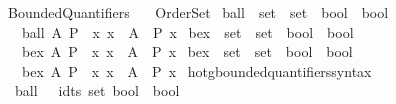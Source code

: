 %
\begin{isabellebody}%
%
%
\isadelimdocument
%
\endisadelimdocument
%
\isatagdocument
\isanewline
\isanewline
%
\isamarkuptrue%
%
\endisatagdocument
{\isafolddocument}%
%
\isadelimdocument
%
\endisadelimdocument
%
\isadelimtheory
%
\endisadelimtheory
%
\isatagtheory
{}\isamarkupfalse%
\ Bounded{\isacharunderscore}{\kern0pt}Quantifiers\isanewline
\ \ \ Order{\isacharunderscore}{\kern0pt}Set\isanewline
{}%
\endisatagtheory
{\isafoldtheory}%
%
\isadelimtheory
\isanewline
%
\endisadelimtheory
\isanewline
{}\isamarkupfalse%
\ ball\ {\isacharcolon}{\kern0pt}{\isacharcolon}{\kern0pt}\ {\isacartoucheopen}set\ {\isasymRightarrow}\ {\isacharparenleft}{\kern0pt}set\ {\isasymRightarrow}\ bool{\isacharparenright}{\kern0pt}\ {\isasymRightarrow}\ bool{\isacartoucheclose}\isanewline
\ \ \ {\isachardoublequoteopen}ball\ A\ P\ {\isasymequiv}\ {\isacharparenleft}{\kern0pt}{\isasymforall}x{\isachardot}{\kern0pt}\ x\ {\isasymin}\ A\ {\isasymlongrightarrow}\ P\ x{\isacharparenright}{\kern0pt}{\isachardoublequoteclose}\isanewline
\isanewline
{}\isamarkupfalse%
\ bex\ {\isacharcolon}{\kern0pt}{\isacharcolon}{\kern0pt}\ {\isacartoucheopen}set\ {\isasymRightarrow}\ {\isacharparenleft}{\kern0pt}set\ {\isasymRightarrow}\ bool{\isacharparenright}{\kern0pt}\ {\isasymRightarrow}\ bool{\isacartoucheclose}\isanewline
\ \ \ {\isachardoublequoteopen}bex\ A\ P\ {\isasymequiv}\ {\isasymexists}x{\isachardot}{\kern0pt}\ x\ {\isasymin}\ A\ {\isasymand}\ P\ x{\isachardoublequoteclose}\isanewline
\isanewline
{}\isamarkupfalse%
\ bex{}\ {\isacharcolon}{\kern0pt}{\isacharcolon}{\kern0pt}\ {\isacartoucheopen}set\ {\isasymRightarrow}\ {\isacharparenleft}{\kern0pt}set\ {\isasymRightarrow}\ bool{\isacharparenright}{\kern0pt}\ {\isasymRightarrow}\ bool{\isacartoucheclose}\isanewline
\ \ \ {\isachardoublequoteopen}bex{}\ A\ P\ {\isasymequiv}\ {\isasymexists}{\isacharbang}{\kern0pt}x{\isachardot}{\kern0pt}\ x\ {\isasymin}\ A\ {\isasymand}\ P\ x{\isachardoublequoteclose}\isanewline
\isanewline
{}\isamarkupfalse%
\ hotg{\isacharunderscore}{\kern0pt}bounded{\isacharunderscore}{\kern0pt}quantifiers{\isacharunderscore}{\kern0pt}syntax\isanewline
{}\isanewline
{}\isamarkupfalse%
\isanewline
\ \ {\isachardoublequoteopen}{\isacharunderscore}{\kern0pt}ball{\isachardoublequoteclose}\ \ {\isacharcolon}{\kern0pt}{\isacharcolon}{\kern0pt}\ {\isacartoucheopen}{\isacharbrackleft}{\kern0pt}idts{\isacharcomma}{\kern0pt}\ set{\isacharcomma}{\kern0pt}\ bool{\isacharbrackright}{\kern0pt}\ {\isasymRightarrow}\ bool{\isacartoucheclose}\ {\isacharparenleft}{\kern0pt}{\isachardoublequoteopen}{\isacharparenleft}{\kern0pt}{}{\isasymforall}{\isacharunderscore}{\kern0pt}\ {\isasymin}\ {\isacharunderscore}{\kern0pt}{\isachardot}{\kern0pt}{\isacharslash}{\kern0pt}\ {\isacharunderscore}{\kern0pt}{\isacharparenright}{\kern0pt}{\isachardoublequoteclose}\ {}{}{\isacharparenright}{\kern0pt}\isanewline

\end{isabellebody}
